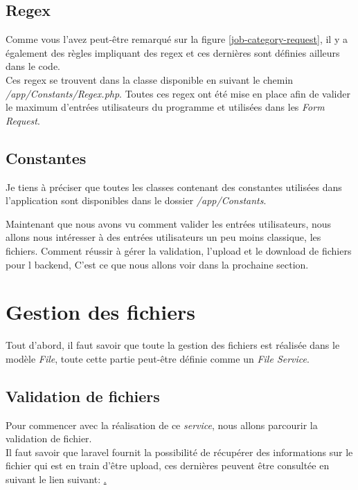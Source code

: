 \documentclass[
    iai, %
    il, %
]{heig-tb}
\begin{document}
\subsection{Regex}
Comme vous l'avez peut-être remarqué sur la figure \ref{job-category-request}, il y a également des règles impliquant des \Gls{regex} et ces dernières sont définies ailleurs dans le code. \\
Ces \Gls{regex} se trouvent dans la classe disponible en suivant le chemin \emph{/app/Constants/Regex.php}. Toutes ces \Gls{regex} ont été mise en place afin de valider le maximum d'entrées utilisateurs du programme et utilisées dans les \emph{Form Request}.

\subsection{Constantes}
Je tiens à préciser que toutes les classes contenant des constantes utilisées dans l'application sont disponibles dans le dossier \emph{/app/Constants}.

Maintenant que nous avons vu comment valider les entrées utilisateurs, nous allons nous intéresser à des entrées utilisateurs un peu moins classique, les fichiers. Comment réussir à gérer la validation, l'upload et le download de fichiers pour l \Gls{backend}, C'est ce que nous allons voir dans la prochaine section.

\section{Gestion des fichiers}
Tout d'abord, il faut savoir que toute la gestion des fichiers est réalisée dans le modèle \emph{File}, toute cette partie peut-être définie comme un \emph{File Service}.

\subsection{Validation de fichiers}

Pour commencer avec la réalisation de ce \emph{service}, nous allons parcourir la validation de fichier. \\
Il faut savoir que \Gls{laravel} fournit la possibilité de récupérer des informations sur le fichier qui est en train d'être upload, ces dernières peuvent être consultée en suivant le lien suivant: \href{https://laravel.com/docs/9.x/filesystem#other-uploaded-file-information}. \\
\end{document}
